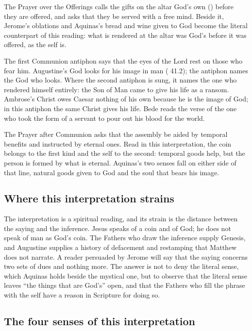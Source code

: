 The Prayer over the Offerings calls the gifts on the altar God's own
() before they are offered, and asks that they be served
with a free mind. Beside it, Jerome's oblations and Aquinas's bread and wine
given to God become the literal counterpart of this reading: what is rendered
at the altar was God's before it was offered, as the self is.

The first Communion antiphon says that the eyes of the Lord rest on those who
fear him. Augustine's God looks for his image in man ( 41.2);
the antiphon names the God who looks. Where the second antiphon is sung, it
names the one who rendered himself entirely: the Son of Man came to give his
life as a ransom. Ambrose's Christ owes Caesar nothing of his own because he
is the image of God; in this antiphon the same Christ gives his life. Bede
reads the verse of the one who took the form of a servant to pour out his
blood for the world.

The Prayer after Communion asks that the assembly be aided by temporal
benefits and instructed by eternal ones. Read in this interpretation, the coin
belongs to the first kind and the self to the second: temporal goods help, but
the person is formed by what is eternal. Aquinas's two senses fall on either
side of that line, natural goods given to God and the soul that bears his
image.

\subsection{Where this interpretation strains}

The interpretation is a spiritual reading, and its strain is the distance
between the saying and the inference. Jesus speaks of a coin and of God; he
does not speak of man as God's coin. The Fathers who draw the inference supply
Genesis, and Augustine supplies a history of defacement and restamping that
Matthew does not narrate. A reader persuaded by Jerome will say that the
saying concerns two sets of dues and nothing more. The answer is not to deny
the literal sense, which Aquinas holds beside the mystical one, but to observe
that the literal sense leaves ``the things that are God's'' open, and that the
Fathers who fill the phrase with the self have a reason in Scripture for doing
so.

\subsection{The four senses of this interpretation}


